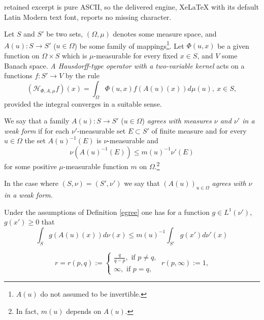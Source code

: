 \documentclass[10pt,a4paper]{amsart}
\begin{document}
retained excerpt is pure ASCII, so the delivered engine, XeLaTeX with its default Latin Modern text font, reports no missing character.
\begin{definition}\label{df:general1_two}  Let  $S$ and  $S'$ be two sets, $(\Omega,\mu)$ denotes some measure space, and $A(u): S\to S'$ ($u\in  \Omega $) be some family of mappings\footnote{$A(u)$ do not assumed to be invertible.}.  Let  $\Phi(u,x)$ be a given  function on $\Omega\times S$ which is $\mu$-measurable for every fixed $x\in S$, and $V$ some Banach space.
 {\it A Hausdorff-type operator  with a two-variable kernel} acts on a  functions $f: S' \to V$  by the rule
\begin{equation}\label{general_two}
(\mathcal{H}_{\Phi,A,\mu}f)(x) =\int_{\Omega} \Phi(u,x)f(A(u)(x))d\mu(u), \ x\in S,
\end{equation}
provided the integral  converges in a suitable  sense.
\end{definition}

\begin{definition}\label{egree} %
 We say that a family $A(u): S\to S'$ ($u\in \Omega$) 
\textit{agrees with  measures $\nu$ and  $\nu'$ in a weak form}   if for each $\nu'$-measurable set $E\subset S'$ of finite measure and for every $u\in \Omega$ the set $A(u)^{-1}(E)$ is  $\nu$-measurable and
\begin{equation}\label{nuA(u)}
\nu(A(u)^{-1}(E))\le m(u)^{-1}\nu'(E)
\end{equation}
for some positive $\mu$-measurable function $m$ on $\Omega$.\footnote{In fact, $m(u)$  depends on $A(u)$.}

In the case where $(S,\nu)=(S',\nu')$ we say that $(A(u))_{u\in \Omega}$
\textit{agrees with   $\nu$  in a weak form}.
\end{definition}

\begin{lemma}\label{lm:IfA(u)}
Under the assumptions of  Definition \ref{egree} one has  for a function  $g\in L^1(\nu')$, $g(x')\ge 0$  that
\begin{equation}\label{IfA(u)}
\int_{S}g(A(u)(x))d\nu(x)\le m(u)^{-1}\int_{S'}g(x')d\nu'(x)
\end{equation}
\end{lemma}

\begin{equation}\label{r}
r=r(p,q):=
\begin{cases}
\frac{q}{q-p}, \mbox{ if } p\ne q,\\
\infty, \mbox{ if } p=q,
\end{cases} \ r(p,\infty):=1,
\end{equation}
\end{document}
